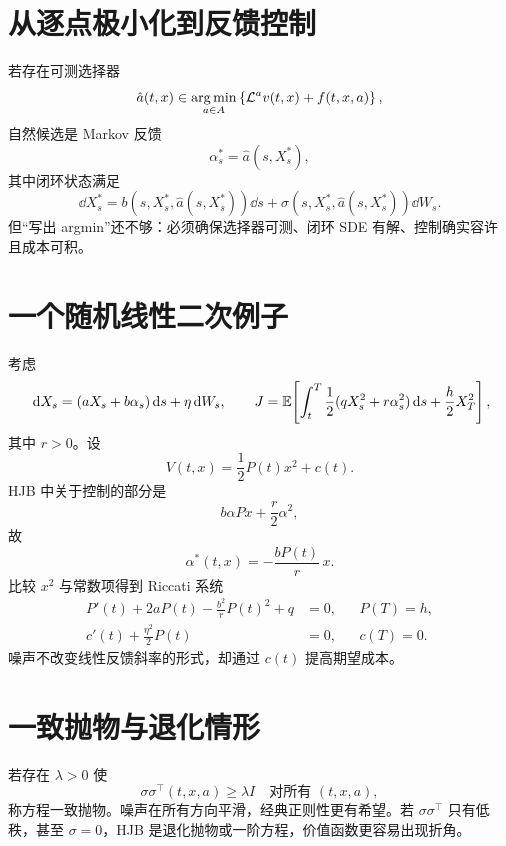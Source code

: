 \section{从逐点极小化到反馈控制}

若存在可测选择器
\[
\hat a(t,x)\in\operatorname*{arg\,min}_{a\in A}
\left\{\mathcal L^av(t,x)+f(t,x,a)\right\},
\]
自然候选是 Markov 反馈
\[
\alpha_s^*=\hat a(s,X_s^*),
\]
其中闭环状态满足
\[
\dd X_s^*=b(s,X_s^*,\hat a(s,X_s^*))\dd s
+\sigma(s,X_s^*,\hat a(s,X_s^*))\dd W_s.
\]
但“写出 argmin”还不够：必须确保选择器可测、闭环 SDE 有解、控制确实容许且成本可积。

\begin{center}
\end{center}

\section{一个随机线性二次例子}

考虑
\[
\,\mathrm{d} X_s=(aX_s+b\alpha_s)\,\mathrm{d} s+\eta\,\mathrm{d} W_s,
\qquad
J=\mathbb{E}\!\left[\int_t^T\frac12(qX_s^2+r\alpha_s^2)\,\mathrm{d} s+\frac h2X_T^2\right],
\]
其中 $r>0$。设
\[
V(t,x)=\frac12P(t)x^2+c(t).
\]
HJB 中关于控制的部分是
\[
b\alpha Px+\frac r2\alpha^2,
\]
故
\[
\alpha^*(t,x)=-\frac{bP(t)}r\,x.
\]
比较 $x^2$ 与常数项得到 Riccati 系统
\[
\begin{aligned}
P'(t)+2aP(t)-\frac{b^2}{r}P(t)^2+q&=0,
&&P(T)=h,\\
c'(t)+\frac{\eta^2}{2}P(t)&=0,
&&c(T)=0.
\end{aligned}
\]
噪声不改变线性反馈斜率的形式，却通过 $c(t)$ 提高期望成本。

\section{一致抛物与退化情形}

若存在 $\lambda>0$ 使
\[
\sigma\sigma^\top(t,x,a)\ge\lambda I
\quad\text{对所有 }(t,x,a),
\]
称方程一致抛物。噪声在所有方向平滑，经典正则性更有希望。若 $\sigma\sigma^\top$ 只有低秩，甚至 $\sigma=0$，HJB 是退化抛物或一阶方程，价值函数更容易出现折角。

